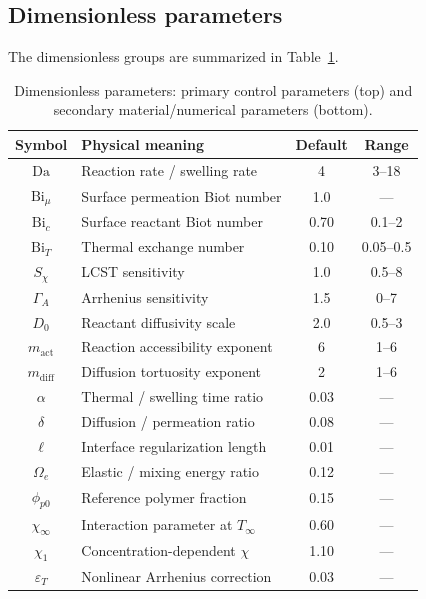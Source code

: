 \documentclass[aps,pre,reprint,superscriptaddress,longbibliography,floatfix]{revtex4-2}
\newcommand{\Da}{\mathrm{Da}}
\newcommand{\Bi}{\mathrm{Bi}}
\newcommand{\pp}{\phi_{p0}}
\begin{document}
\subsection{Dimensionless parameters}

The dimensionless groups are summarized in Table~\ref{tab:params}.

\begin{table}[h]
\centering
\caption{Dimensionless parameters: primary control parameters (top)
  and secondary material/numerical parameters (bottom).}
\label{tab:params}
\begin{ruledtabular}
\begin{tabular}{clcc}
Symbol & Physical meaning & Default & Range\\
\hline
$\Da$            & Reaction rate / swelling rate   & 4     & 3--18\\
$\Bi_\mu$        & Surface permeation Biot number  & 1.0   & ---\\
$\Bi_c$          & Surface reactant Biot number    & 0.70  & 0.1--2\\
$\Bi_T$          & Thermal exchange number         & 0.10  & 0.05--0.5\\
$S_\chi$         & LCST sensitivity               & 1.0   & 0.5--8\\
$\Gamma_A$       & Arrhenius sensitivity           & 1.5   & 0--7\\
$D_0$            & Reactant diffusivity scale     & 2.0   & 0.5--3\\
$m_\mathrm{act}$ & Reaction accessibility exponent& 6     & 1--6\\
$m_\mathrm{diff}$& Diffusion tortuosity exponent  & 2     & 1--6\\
\hline
$\alpha$         & Thermal / swelling time ratio   & 0.03  & ---\\
$\delta$         & Diffusion / permeation ratio    & 0.08  & ---\\
$\ell$           & Interface regularization length & 0.01  & ---\\
$\Omega_e$       & Elastic / mixing energy ratio   & 0.12  & ---\\
$\pp$            & Reference polymer fraction      & 0.15  & ---\\
$\chi_\infty$    & Interaction parameter at $T_\infty$ & 0.60 & ---\\
$\chi_1$         & Concentration-dependent $\chi$  & 1.10  & ---\\
$\varepsilon_T$  & Nonlinear Arrhenius correction  & 0.03  & ---\\
\end{tabular}
\end{ruledtabular}
\end{table}
\end{document}
